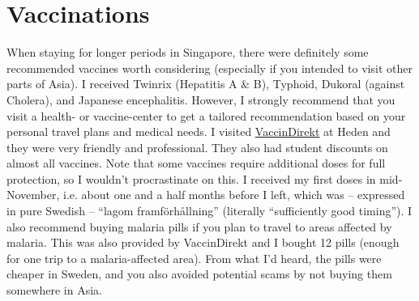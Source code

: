 \section*{Vaccinations}
\label{vacc}
When staying for longer periods in Singapore, there were definitely some recommended vaccines worth considering (especially if you intended to visit other parts of Asia). I received Twinrix (Hepatitis A \& B), Typhoid, Dukoral (against Cholera), and Japanese encephalitis. However, I strongly recommend that you visit a health- or vaccine-center to get a tailored recommendation based on your personal travel plans and medical needs. I visited \href{https://vaccindirekt.se/mottagningar/heden-gbg/}{VaccinDirekt} at Heden and they were very friendly and professional. They also had student discounts on almost all vaccines. Note that some vaccines require additional doses for full protection, so I wouldn't procrastinate on this. I received my first doses in mid-November, i.e. about one and a half months before I left, which was -- expressed in pure Swedish -- ``lagom framförhållning'' (literally ``sufficiently good timing''). I also recommend buying malaria pills if you plan to travel to areas affected by malaria. This was also provided by VaccinDirekt and I bought 12 pills (enough for one trip to a malaria-affected area). From what I'd heard, the pills were cheaper in Sweden, and you also avoided potential scams by not buying them somewhere in Asia.   
